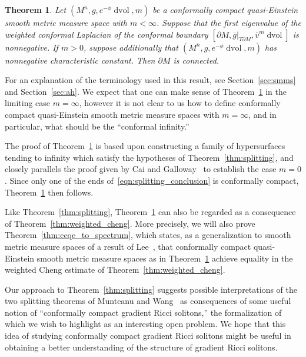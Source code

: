 \documentclass{amsart}
\newtheorem{thm}{Theorem}[section]
\theoremstyle{definition}
\theoremstyle{remark}
\numberwithin{equation}{section}
\begin{document}
\begin{thm}
\label{thm:connectedness}
Let $(M^n,g,e^{-\phi}\operatorname{dvol},m)$ be a conformally compact quasi-Einstein smooth metric measure space with $m<\infty$.  Suppose that the first eigenvalue of the weighted conformal Laplacian of the conformal boundary $[\partial M,{\overline{g}}{\rvert}_{T\partial M},{\overline{v}}^m\operatorname{dvol}]$ is nonnegative.  If $m>0$, suppose additionally that $(M^n,g,e^{-\phi}\operatorname{dvol},m)$ has nonnegative characteristic constant.  Then $\partial M$ is connected.
\end{thm}

For an explanation of the terminology used in this result, see Section~\ref{sec:smms} and Section~\ref{sec:ah}.  We expect that one can make sense of Theorem~\ref{thm:connectedness} in the limiting case $m=\infty$, however it is not clear to us how to define conformally compact quasi-Einstein smooth metric measure spaces with $m=\infty$, and in particular, what should be the ``conformal infinity.''

The proof of Theorem~\ref{thm:connectedness} is based upon constructing a family of hypersurfaces tending to infinity which satisfy the hypotheses of Theorem~\ref{thm:splitting}, and closely parallels the proof given by Cai and Galloway~\cite{CaiGalloway1999} to establish the case $m=0$.  Since only one of the ends of~\eqref{eqn:splitting_conclusion} is conformally compact, Theorem~\ref{thm:connectedness} then follows.

Like Theorem~\ref{thm:splitting}, Theorem~\ref{thm:connectedness} can also be regarded as a consequence of Theorem~\ref{thm:weighted_cheng}.  More precisely, we will also prove Theorem~\ref{thm:ccqe_to_spectrum}, which states, as a generalization to smooth metric measure spaces of a result of Lee~\cite{Lee1995}, that conformally compact quasi-Einstein smooth metric measure spaces as in Theorem~\ref{thm:connectedness} achieve equality in the weighted Cheng estimate of Theorem~\ref{thm:weighted_cheng}.

Our approach to Theorem~\ref{thm:splitting} suggests possible interpretations of the two splitting theorems of Munteanu and Wang~\cite{MunteanuWang2011,MunteanuWang2011b} as consequences of some useful notion of ``conformally compact gradient Ricci solitons,'' the formalization of which we wish to highlight as an interesting open problem.  We hope that this idea of studying conformally compact gradient Ricci solitons might be useful in obtaining a better understanding of the structure of gradient Ricci solitons.
\end{document}
